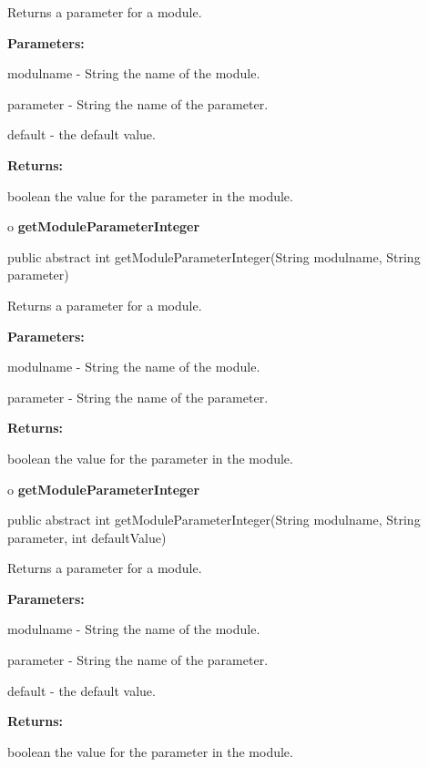 \begin{description}
\htmlDD Returns a parameter for a module. 

\begin{description}
\item {\bf Parameters:}  

modulname - String the name of the module.  

parameter - String the name of the parameter.  

default - the default value.  
\item {\bf Returns:}  

boolean the value for the parameter in the module.  
\end{description}

\end{description}

o {\bf getModuleParameterInteger} 

\begin{PRE}
 public abstract int getModuleParameterInteger(String modulname,
                                               String parameter)
\end{PRE}

\begin{description}
\htmlDD Returns a parameter for a module. 

\begin{description}
\item {\bf Parameters:}  

modulname - String the name of the module.  

parameter - String the name of the parameter.  
\item {\bf Returns:}  

boolean the value for the parameter in the module.  
\end{description}

\end{description}

o {\bf getModuleParameterInteger} 

\begin{PRE}
 public abstract int getModuleParameterInteger(String modulname,
                                               String parameter,
                                               int defaultValue)
\end{PRE}

\begin{description}
\htmlDD Returns a parameter for a module. 

\begin{description}
\item {\bf Parameters:}  

modulname - String the name of the module.  

parameter - String the name of the parameter.  

default - the default value.  
\item {\bf Returns:}  

boolean the value for the parameter in the module.  
\end{description}

\end{description}

